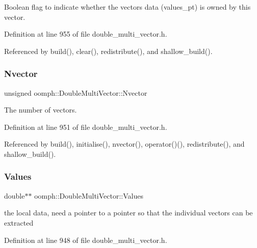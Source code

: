 Boolean flag to indicate whether the vector\textquotesingle{}s data (values\+\_\+pt) is owned by this vector. 



Definition at line 955 of file double\+\_\+multi\+\_\+vector.\+h.



Referenced by build(), clear(), redistribute(), and shallow\+\_\+build().

\mbox{\label{classoomph_1_1DoubleMultiVector_a21446924694c708c6a82cc908bf7846a}} 
\subsubsection{\texorpdfstring{Nvector}{Nvector}}
{\footnotesize\ttfamily unsigned oomph\+::\+Double\+Multi\+Vector\+::\+Nvector\hspace{0.3cm}{\ttfamily [private]}}



The number of vectors. 



Definition at line 951 of file double\+\_\+multi\+\_\+vector.\+h.



Referenced by build(), initialise(), nvector(), operator()(), redistribute(), and shallow\+\_\+build().

\mbox{\label{classoomph_1_1DoubleMultiVector_a562d13abfae53ad5b3e3c6020b4da0e5}} 
\subsubsection{\texorpdfstring{Values}{Values}}
{\footnotesize\ttfamily double$\ast$$\ast$ oomph\+::\+Double\+Multi\+Vector\+::\+Values\hspace{0.3cm}{\ttfamily [private]}}

the local data, need a pointer to a pointer so that the individual vectors can be extracted 

Definition at line 948 of file double\+\_\+multi\+\_\+vector.\+h.



